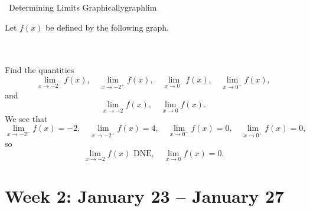         \begin{example}{\Difficulty\,\Difficulty\,\,Determining Limits Graphically}{graphlim}
            
            Let \(f(x)\) be defined by the following graph.
            \begin{center}
            \end{center}
            \vphantom
            \\
            \\
            Find the quantities
            \begin{equation*}
                \lim_{x\to -2^-}f(x),\quad \lim_{x\to -2^+}f(x),\quad \lim_{x\to 0^-}f(x),\quad \lim_{x\to 0^+}f(x),
            \end{equation*}
            and
            \begin{equation*}
                \lim_{x\to -2}f(x),\quad \lim_{x\to 0}f(x).
            \end{equation*}
            We see that
            \begin{equation*}
                \lim_{x\to -2^-}f(x)=-2,\quad \lim_{x\to -2^+}f(x)=4,\quad \lim_{x\to 0^-}f(x)=0,\quad \lim_{x\to 0^+}f(x)=0,
            \end{equation*}
            so
            \begin{equation*}
                \lim_{x\to -2}f(x)\text{ DNE},\quad \lim_{x\to 0}f(x)=0.
            \end{equation*}

        \end{example}

\pagebreak

\section{Week 2: January 23 -- January 27}

